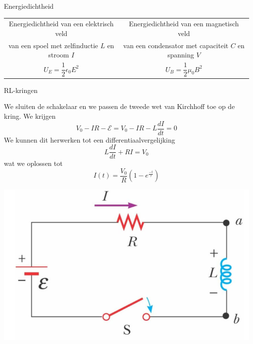 \begin{vrg}[Energiedichtheid]{Energiedichtheid}   
    \vspace{-0.3cm}
    \def\arraystretch{2}
    \centering
    \begin{tabular}{c|c}
        Energiedichtheid van een elektrisch veld & Energiedichtheid van een magnetisch veld \\[-0.35cm]
        van een spoel met zelfinductie $L$ en stroom $I$ & van een condensator met capaciteit $C$ en spanning $V$ \\ \hline
        $U_{E} = \dfrac{1}{2}\epsilon_{0}E^{2}$ & $U_{B} = \dfrac{1}{2}\mu_{0}B^{2}$ \\
    \end{tabular}
\end{vrg}

\begin{app}[RL-kringen]{RL-kringen}
    \vspace{-0.5cm}
    \begin{minipage}{.66\textwidth}
        We sluiten de schakelaar en we passen de tweede wet van Kirchhoff toe op de kring. We krijgen
        \begin{equation*}
            V_{0} - IR - \mathcal{E} = V_{0} - IR - L\dfrac{dI}{dt} = 0
        \end{equation*}
        We kunnen dit herwerken tot een differentiaalvergelijking
        \begin{equation*}
            L\dfrac{dI}{dt} + RI = V_{0}
        \end{equation*}
        wat we oplossen tot 
        \begin{equation*}
            I(t) = \dfrac{V_{0}}{R}\left(1 - e^{\tfrac{-t}{\tau}}\right)
        \end{equation*} 
    \end{minipage}
    \begin{minipage}{.3\textwidth}
        \hspace{0.5cm}\includegraphics[scale = 0.35]{Images/Magnetisme/RLKring}

\end{minipage}
\end{app}
